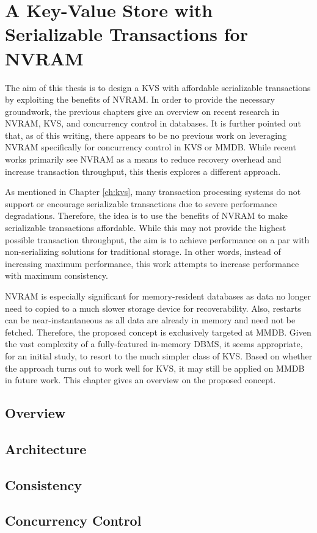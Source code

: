 \chapter{A Key-Value Store with Serializable Transactions for NVRAM}
\label{ch:concept}

The aim of this thesis is to design a KVS with affordable serializable
transactions by exploiting the benefits of NVRAM. In order to provide the
necessary groundwork, the previous chapters give an overview on recent research
in NVRAM, KVS, and concurrency control in databases. It is further pointed out
that, as of this writing, there appears to be no previous work on leveraging
NVRAM specifically for concurrency control in KVS or MMDB. While recent works
primarily see NVRAM as a means to reduce recovery overhead and increase
transaction throughput, this thesis explores a different approach.

As mentioned in Chapter \ref{ch:kvs}, many transaction processing systems do not
support or encourage serializable transactions due to severe performance
degradations. Therefore, the idea is to use the benefits of NVRAM to make
serializable transactions affordable. While this may not provide the highest
possible transaction throughput, the aim is to achieve performance on a par with
non-serializing solutions for traditional storage. In other words, instead of
increasing maximum performance, this work attempts to increase performance with
maximum consistency.

NVRAM is especially significant for memory-resident databases as data no longer
need to copied to a much slower storage device for recoverability. Also,
restarts can be near-instantaneous as all data are already in memory and need
not be fetched. Therefore, the proposed concept is exclusively targeted at MMDB.
Given the vast complexity of a fully-featured in-memory DBMS, it seems
appropriate, for an initial study, to resort to the much simpler class of KVS.
Based on whether the approach turns out to work well for KVS, it may still be
applied on MMDB in future work. This chapter gives an overview on the proposed
concept.

\section{Overview}
\section{Architecture}
\section{Consistency}
\section{Concurrency Control}
